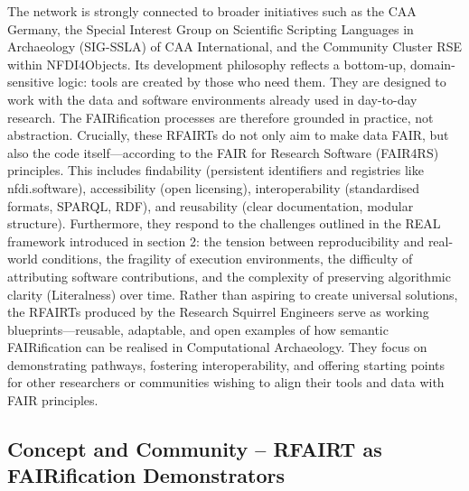 \documentclass{eceasst}
\begin{document}
The network is strongly connected to broader initiatives such as the CAA Germany, the Special Interest Group on Scientific Scripting Languages in Archaeology (SIG-SSLA) of CAA International, and the Community Cluster RSE within NFDI4Objects. Its development philosophy reflects a bottom-up, domain-sensitive logic: tools are created by those who need them. They are designed to work with the data and software environments already used in day-to-day research. The FAIRification processes are therefore grounded in practice, not abstraction. Crucially, these RFAIRTs do not only aim to make data FAIR, but also the code itself—according to the FAIR for Research Software (FAIR4RS) principles. This includes findability (persistent identifiers and registries like nfdi.software), accessibility (open licensing), interoperability (standardised formats, SPARQL, RDF), and reusability (clear documentation, modular structure). Furthermore, they respond to the challenges outlined in the REAL framework introduced in section 2: the tension between reproducibility and real-world conditions, the fragility of execution environments, the difficulty of attributing software contributions, and the complexity of preserving algorithmic clarity (Literalness) over time. Rather than aspiring to create universal solutions, the RFAIRTs produced by the Research Squirrel Engineers serve as working blueprints—reusable, adaptable, and open examples of how semantic FAIRification can be realised in Computational Archaeology. They focus on demonstrating pathways, fostering interoperability, and offering starting points for other researchers or communities wishing to align their tools and data with FAIR principles.

\subsection{Concept and Community – RFAIRT as FAIRification Demonstrators}\label{sec:31}
\end{document}
